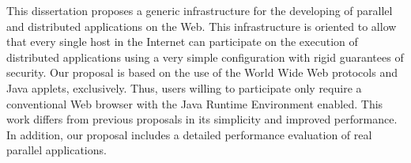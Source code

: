 \begin{abstracts} 
This dissertation proposes a generic infrastructure for the developing of
parallel and distributed applications on the Web.  This infrastructure
is oriented to allow that every single host in the Internet can
participate on the execution of distributed applications using a very
simple configuration with rigid guarantees of security.  Our proposal
is based on the use of the World Wide Web protocols and Java applets,
exclusively.  Thus, users willing to participate only require a
conventional Web browser with the Java Runtime Environment enabled.
This work differs from previous proposals in its simplicity and
improved performance.  In addition, our proposal includes a detailed
performance evaluation of real parallel applications.
\end{abstracts}
